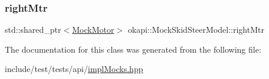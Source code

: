 \subsubsection{\texorpdfstring{rightMtr}{rightMtr}}
{\footnotesize\ttfamily std\+::shared\+\_\+ptr$<$\mbox{\hyperlink{classokapi_1_1MockMotor}{Mock\+Motor}}$>$ okapi\+::\+Mock\+Skid\+Steer\+Model\+::right\+Mtr}



The documentation for this class was generated from the following file\+:\begin{DoxyCompactItemize}
\item 
include/test/tests/api/\mbox{\hyperlink{implMocks_8hpp}{impl\+Mocks.\+hpp}}\end{DoxyCompactItemize}
